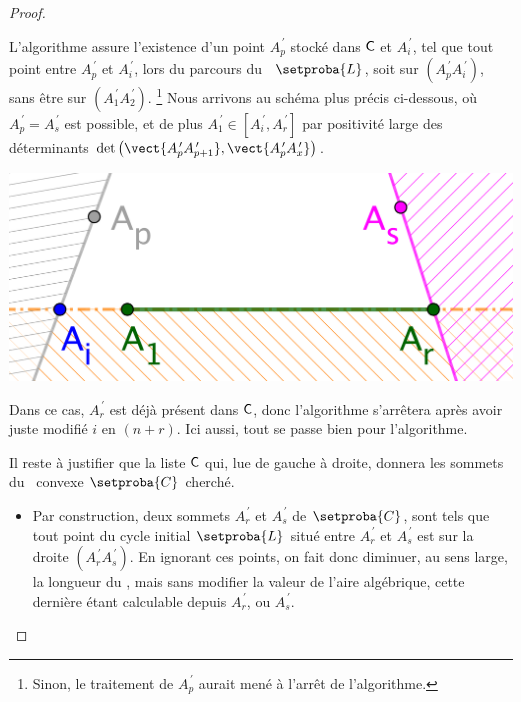 \begin{proof}
\begin{itemize}
        \noindent
        L'algorithme assure l'existence d'un point $A^{\,\prime}_p$ stocké dans $\mathsf{C}$ et  $A^{\,\prime}_i$,
        tel que tout point entre $A^{\,\prime}_p$ et $A^{\,\prime}_i$, lors du parcours du \ncycle\ $\setproba{L}$, soit sur $(A^{\,\prime}_p A^{\,\prime}_i)$,
        sans être sur $(A^{\,\prime}_1 A^{\,\prime}_2)$.%
        \footnote{
            Sinon, le traitement de $A^{\,\prime}_p$ aurait mené à l'arrêt de l'algorithme.
        }
        Nous arrivons au schéma plus précis ci-dessous, où $A^{\,\prime}_p = A^{\,\prime}_s$ est possible,
        et de plus
        $A^{\,\prime}_1 \in [ A^{\,\prime}_i , A^{\,\prime}_r ]$
        par positivité large des déterminants
        $\det \big( \vect{A^{\,\prime}_p A^{\,\prime}_{p+1}}, \vect{A^{\,\prime}_p A^{\,\prime}_x} \big)$.
        \begin{center}
        	\includegraphics[scale=.4]{content/polygon/at-least-one/algo-kgone-terminate-3.png}
        \end{center}
        
        \noindent
        Dans ce cas,
        $A^{\,\prime}_r$ est déjà présent dans $\mathsf{C}$,
        donc l'algorithme s'arrêtera après avoir juste modifié $i$ en $(n + r)$.
        Ici aussi, tout se passe bien pour l'algorithme.
    \end{itemize}
    
    \medskip
    
    Il reste à justifier que la liste $\mathsf{C}$ qui, lue de gauche à droite, donnera les sommets du \kgone\ convexe $\setproba{C}$ cherché.
    \begin{itemize}
        \item Par construction, deux sommets  $A^{\,\prime}_r$ et $A^{\,\prime}_s$ de $\setproba{C}$, sont tels que tout point du cycle initial $\setproba{L}$ situé entre $A^{\,\prime}_r$ et $A^{\,\prime}_s$ est sur la droite $(A^{\,\prime}_r A^{\,\prime}_s)$.
        En ignorant ces points, on fait donc diminuer, au sens large, la longueur du \ncycle, mais sans modifier la valeur de l'aire algébrique, cette dernière étant calculable depuis $A^{\,\prime}_r$, ou $A^{\,\prime}_s$.



\end{itemize}
\end{proof}
